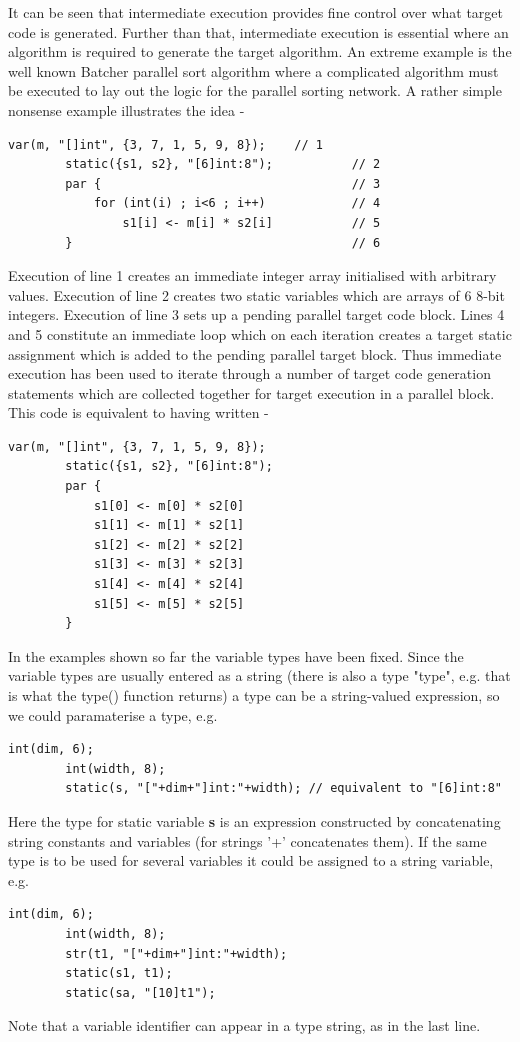 \documentclass[10pt,a4paper,twoside,fleqn]{article}
\newcommand{\var}[1]{{\bf #1}} %
\begin{document}
    It can be seen that intermediate execution provides fine control over what
    target code is generated. Further than that, intermediate execution is
    essential where an algorithm is required to generate the target algorithm.
    An extreme example is the well known Batcher parallel sort algorithm where
    a complicated algorithm must be executed to lay out the logic for the
    parallel sorting network. A rather simple nonsense example illustrates the
    idea -
    \begin{lstlisting}[language=threepl]
        var(m, "[]int", {3, 7, 1, 5, 9, 8});    // 1
        static({s1, s2}, "[6]int:8");           // 2
        par {                                   // 3
            for (int(i) ; i<6 ; i++)            // 4
                s1[i] <- m[i] * s2[i]           // 5
        }                                       // 6
    \end{lstlisting}
    Execution of line 1 creates an immediate integer array initialised with
    arbitrary values. Execution of line 2 creates two static variables which are
    arrays of 6 8-bit integers. Execution of line 3 sets up a pending parallel
    target code block. Lines 4 and 5 constitute an immediate loop which on
    each iteration creates a target static assignment which is added to the
    pending parallel target block. Thus immediate execution has been used to
    iterate through a number of target code generation statements which are
    collected together for target execution in a parallel block. This code is
    equivalent to having written -
    \begin{lstlisting}[language=threepl]
        var(m, "[]int", {3, 7, 1, 5, 9, 8});    
        static({s1, s2}, "[6]int:8");   
        par {   
            s1[0] <- m[0] * s2[0]
            s1[1] <- m[1] * s2[1]
            s1[2] <- m[2] * s2[2]
            s1[3] <- m[3] * s2[3]
            s1[4] <- m[4] * s2[4]
            s1[5] <- m[5] * s2[5]
        }
    \end{lstlisting}
    
    In the examples shown so far the variable types have been fixed. Since
    the variable types are usually entered as a string (there is also a type
    "type", e.g. that is what the type() function returns) a type can be
    a string-valued expression, so we could paramaterise a type, e.g.
    \begin{lstlisting}[language=threepl]
        int(dim, 6);
        int(width, 8);
        static(s, "["+dim+"]int:"+width); // equivalent to "[6]int:8"
    \end{lstlisting}
    Here the type for static variable \var{s} is an expression constructed by
    concatenating string constants and variables (for strings '+' concatenates
    them). If the same type is to be used for several variables it could be
    assigned to a string variable, e.g.
    \begin{lstlisting}[language=threepl]
        int(dim, 6);
        int(width, 8);
        str(t1, "["+dim+"]int:"+width);
        static(s1, t1);
        static(sa, "[10]t1");
    \end{lstlisting}
    Note that a variable identifier can appear in a type string, as in the last
    line.
    
\end{document}
